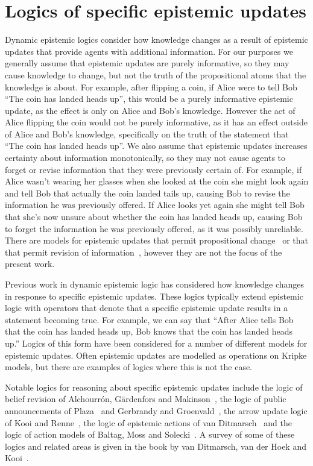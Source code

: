\section{Logics of specific epistemic updates}

Dynamic epistemic logics consider how knowledge changes as a result of epistemic updates that provide agents with additional information.
For our purposes we generally assume that epistemic updates are purely informative, so they may cause knowledge to change, but not the truth of the propositional atoms that the knowledge is about.
For example, after flipping a coin, if Alice were to tell Bob ``The coin has landed heads up'', this would be a purely informative epistemic update, as the effect is only on Alice and Bob's knowledge.
However the act of Alice flipping the coin would not be purely informative, as it has an effect outside of Alice and Bob's knowledge, specifically on the truth of the statement that ``The coin has landed heads up''.
We also assume that epistemic updates increases certainty about information monotonically, so they may not cause agents to forget or revise information that they were previously certain of.
For example, if Alice wasn't wearing her glasses when she looked at the coin she might look again and tell Bob that actually the coin landed tails up, causing Bob to revise the information he was previously offered.
If Alice looks yet again she might tell Bob that she's now unsure about whether the coin has landed heads up, causing Bob to forget the information he was previously offered, as it was possibly unreliable.
There are models for epistemic updates that permit propositional change~\cite{vanbenthem:2006} or that that permit revision of information~\cite{alchourron:1985}, however they are not the focus of the present work.

Previous work in dynamic epistemic logic has considered how knowledge changes in response to specific epistemic updates.
These logics typically extend epistemic logic with operators that denote that a specific epistemic update results in a statement becoming true.
For example, we can say that ``After Alice tells Bob that the coin has landed heads up, Bob knows that the coin has landed heads up.''
Logics of this form have been considered for a number of different models for epistemic updates.
Often epistemic updates are modelled as operations on Kripke models, but there are examples of logics where this is not the case.

Notable logics for reasoning about specific epistemic updates include the logic of belief revision of Alchourr{\'o}n, G{\"a}rdenfors and Makinson~\cite{alchourron:1985}, the logic of public announcements of Plaza~\cite{plaza:1989} and Gerbrandy and Groenvald~\cite{gerbrandy:1997}, the arrow update logic of Kooi and Renne~\cite{kooi:2011a}, the logic of epistemic actions of van Ditmarsch~\cite{vanditmarsch:1999, vanditmarsch:2000, vanditmarsch:2002} and the logic of action models of Baltag, Moss and Solecki~\cite{baltag:1999, baltag:2004}.
A survey of some of these logics and related areas is given in the book by van Ditmarsch, van der Hoek and Kooi~\cite{vanditmarsch:2007}.

